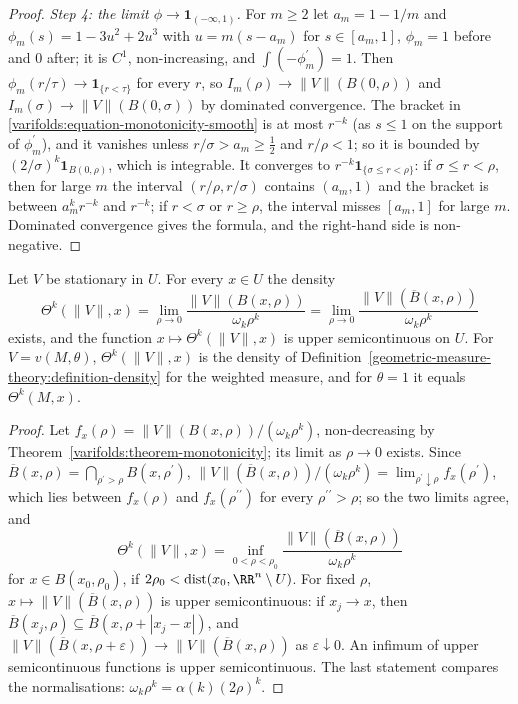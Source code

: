 \begin{proof}
\emph{Step 4: the limit $\phi \to \mathbf{1}_{(-\infty, 1)}$.} For $m \geq 2$ let $a_m = 1 - 1/m$ and $\phi_m(s) = 1 - 3u^2 + 2u^3$ with $u = m(s - a_m)$ for $s \in [a_m, 1]$, $\phi_m = 1$ before and $0$ after; it is $C^1$,
non-increasing, and $\int(-\phi_m^{\prime}) = 1$. Then $\phi_m(r/\tau) \to \mathbf{1}_{\{r < \tau\}}$ for every $r$, so $I_m(\rho) \to \|V\|(B(0, \rho))$ and $I_m(\sigma) \to \|V\|(B(0, \sigma))$ by dominated
convergence. The bracket in \eqref{varifolds:equation-monotonicity-smooth} is at most $r^{-k}$ (as $s \leq 1$ on the support of $\phi_m^{\prime}$), and it vanishes unless $r/\sigma > a_m \geq \frac12$ and
$r/\rho < 1$; so it is bounded by $(2/\sigma)^k\mathbf{1}_{B(0, \rho)}$, which is integrable. It converges to $r^{-k}\mathbf{1}_{\{\sigma \leq r < \rho\}}$: if $\sigma \leq r < \rho$, then for large $m$ the interval
$(r/\rho, r/\sigma)$ contains $(a_m, 1)$ and the bracket is between $a_m^kr^{-k}$ and $r^{-k}$; if $r < \sigma$ or $r \geq \rho$, the interval misses $[a_m, 1]$ for large $m$. Dominated convergence gives the
formula, and the right-hand side is non-negative.
\end{proof}

\begin{corollary}\label{varifolds:corollary-density}
Let $V$ be stationary in $U$. For every $x \in U$ the density
\[
\Theta^k(\|V\|, x) = \lim_{\rho \to 0}\frac{\|V\|(B(x, \rho))}{\omega_k\rho^k} = \lim_{\rho \to 0}\frac{\|V\|(\overline{B}(x, \rho))}{\omega_k\rho^k}
\]
exists, and the function $x \mapsto \Theta^k(\|V\|, x)$ is upper semicontinuous on $U$. For $V = v(M, \theta)$, $\Theta^k(\|V\|, x)$ is the density of Definition~\ref{geometric-measure-theory:definition-density}
for the weighted measure, and for $\theta = 1$ it equals $\Theta^k(M, x)$.
\end{corollary}

\begin{proof}
Let $f_x(\rho) = \|V\|(B(x, \rho))/(\omega_k\rho^k)$, non-decreasing by Theorem~\ref{varifolds:theorem-monotonicity}; its limit as $\rho \to 0$ exists. Since $\overline{B}(x, \rho) = \bigcap_{\rho^{\prime} > \rho}B(x, \rho^{\prime})$,
$\|V\|(\overline{B}(x, \rho))/(\omega_k\rho^k) = \lim_{\rho^{\prime} \downarrow \rho}f_x(\rho^{\prime})$, which lies between $f_x(\rho)$ and $f_x(\rho^{\prime\prime})$ for every $\rho^{\prime\prime} > \rho$; so the two limits agree, and
\[
\Theta^k(\|V\|, x) = \inf_{0 < \rho < \rho_0}\frac{\|V\|(\overline{B}(x, \rho))}{\omega_k\rho^k}
\]
for $x \in B(x_0, \rho_0)$, if $2\rho_0 < \operatorname{dist}(x_0, \RR^n \setminus U)$. For fixed $\rho$, $x \mapsto \|V\|(\overline{B}(x, \rho))$ is upper semicontinuous: if $x_j \to x$, then
$\overline{B}(x_j, \rho) \subseteq \overline{B}(x, \rho + |x_j - x|)$, and $\|V\|(\overline{B}(x, \rho + \varepsilon)) \to \|V\|(\overline{B}(x, \rho))$ as $\varepsilon \downarrow 0$. An infimum of upper semicontinuous
functions is upper semicontinuous. The last statement compares the normalisations: $\omega_k\rho^k = \alpha(k)(2\rho)^k$.
\end{proof}

